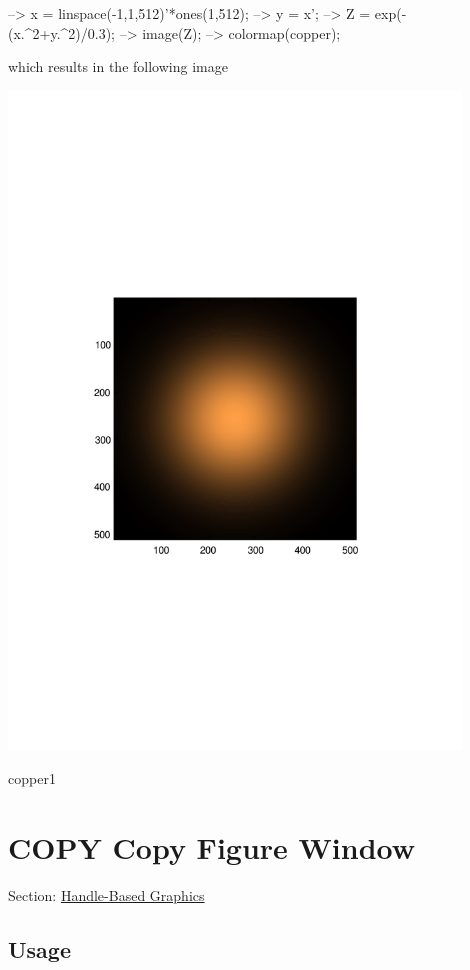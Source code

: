 \begin{DoxyVerbInclude}
--> x = linspace(-1,1,512)'*ones(1,512);
--> y = x';
--> Z = exp(-(x.^2+y.^2)/0.3);
--> image(Z);
--> colormap(copper);
\end{DoxyVerbInclude}


which results in the following image  
\begin{DoxyImage}
\includegraphics[width=12cm]{copper1}
\caption{copper1}
\end{DoxyImage}
 \hypertarget{handle_copy}{}\section{C\-O\-P\-Y Copy Figure Window}\label{handle_copy}
Section\-: \hyperlink{sec_handle}{Handle-\/\-Based Graphics} \hypertarget{vtkwidgets_vtkxyplotwidget_Usage}{}\subsection{Usage}\label{vtkwidgets_vtkxyplotwidget_Usage}
